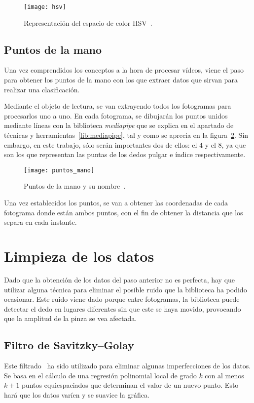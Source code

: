 \begin{figure}[h]
	\texttt{[image: hsv]}
	\centering
	\caption[Representación del espacio de color HSV]{Representación del espacio de color HSV~\cite{wiki:hsv}.}
	\label{fig:hsv}
\end{figure}


\subsection{Puntos de la mano}
Una vez comprendidos los conceptos a la hora de procesar vídeos, viene el paso para obtener los puntos de la mano con los que extraer datos que sirvan para realizar una clasificación.

Mediante el objeto de lectura, se van extrayendo todos los fotogramas para procesarlos uno a uno. En cada fotograma, se dibujarán los puntos unidos mediante líneas con la biblioteca \textit{mediapipe} que se explica en el apartado de técnicas y herramientas~\ref{lib:mediapipe}, tal y como se aprecia en la figura~\ref{fig:puntosmano}. Sin embargo, en este trabajo, sólo serán importantes dos de ellos: el 4 y el 8, ya que son los que representan las puntas de los dedos pulgar e índice respectivamente.

\begin{figure}[h]
	\texttt{[image: puntos\_mano]}
	\centering
	\caption[Puntos de la mano y su nombre.]{Puntos de la mano y su nombre~\cite{mediapipehands}.}
	\label{fig:puntosmano}
\end{figure}

Una vez establecidos los puntos, se van a obtener las coordenadas de cada fotograma donde están ambos puntos, con el fin de obtener la distancia que los separa en cada instante.

\section{Limpieza de los datos} \label{limpieza}
Dado que la obtención de los datos del paso anterior no es perfecta, hay que utilizar alguna técnica para eliminar el posible ruido que la biblioteca ha podido ocasionar. Este ruido viene dado porque entre fotogramas, la biblioteca puede detectar el dedo en lugares diferentes sin que este se haya movido, provocando que la amplitud de la pinza se vea afectada.

\subsection{Filtro de Savitzky–Golay} \label{savgol}
Este filtrado~\cite{wiki:savgol} ha sido utilizado para eliminar algunas imperfecciones de los datos. Se basa en el cálculo de una regresión polinomial local de grado $k$ con al menos $k+1$ puntos equiespaciados que determinan el valor de un nuevo punto. Esto hará que los datos varíen y se suavice la gráfica. 


